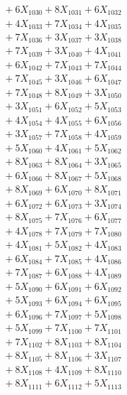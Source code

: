 \documentclass[a4paper,10pt]{article}
\begin{document}
{\begin{align}
&\;  + 6 X_{1030} + 8 X_{1031} + 6 X_{1032} \\[0.3ex]
&\;  + 4 X_{1033} + 7 X_{1034} + 4 X_{1035} \\[0.3ex]
&\;  + 7 X_{1036} + 3 X_{1037} + 3 X_{1038} \\[0.3ex]
&\;  + 7 X_{1039} + 3 X_{1040} + 4 X_{1041} \\[0.3ex]
&\;  + 6 X_{1042} + 7 X_{1043} + 7 X_{1044} \\[0.3ex]
&\;  + 7 X_{1045} + 3 X_{1046} + 6 X_{1047} \\[0.3ex]
&\;  + 7 X_{1048} + 8 X_{1049} + 3 X_{1050} \\[0.3ex]
&\;  + 3 X_{1051} + 6 X_{1052} + 5 X_{1053} \\[0.3ex]
&\;  + 4 X_{1054} + 4 X_{1055} + 6 X_{1056} \\[0.3ex]
&\;  + 3 X_{1057} + 7 X_{1058} + 4 X_{1059} \\[0.5ex]\allowbreak
&\;  + 5 X_{1060} + 4 X_{1061} + 5 X_{1062} \\[0.3ex]
&\;  + 8 X_{1063} + 8 X_{1064} + 3 X_{1065} \\[0.3ex]
&\;  + 6 X_{1066} + 8 X_{1067} + 5 X_{1068} \\[0.3ex]
&\;  + 8 X_{1069} + 6 X_{1070} + 8 X_{1071} \\[0.3ex]
&\;  + 6 X_{1072} + 6 X_{1073} + 3 X_{1074} \\[0.3ex]
&\;  + 8 X_{1075} + 7 X_{1076} + 6 X_{1077} \\[0.3ex]
&\;  + 4 X_{1078} + 7 X_{1079} + 7 X_{1080} \\[0.3ex]
&\;  + 4 X_{1081} + 5 X_{1082} + 4 X_{1083} \\[0.3ex]
&\;  + 6 X_{1084} + 7 X_{1085} + 4 X_{1086} \\[0.3ex]
&\;  + 7 X_{1087} + 6 X_{1088} + 4 X_{1089} \\[0.5ex]\allowbreak
&\;  + 5 X_{1090} + 6 X_{1091} + 6 X_{1092} \\[0.3ex]
&\;  + 5 X_{1093} + 6 X_{1094} + 6 X_{1095} \\[0.3ex]
&\;  + 6 X_{1096} + 7 X_{1097} + 5 X_{1098} \\[0.3ex]
&\;  + 5 X_{1099} + 7 X_{1100} + 7 X_{1101} \\[0.3ex]
&\;  + 7 X_{1102} + 8 X_{1103} + 8 X_{1104} \\[0.3ex]
&\;  + 8 X_{1105} + 8 X_{1106} + 3 X_{1107} \\[0.3ex]
&\;  + 8 X_{1108} + 4 X_{1109} + 8 X_{1110} \\[0.3ex]
&\;  + 8 X_{1111} + 6 X_{1112} + 5 X_{1113} \\[0.3ex]

\end{align}}
\end{document}
